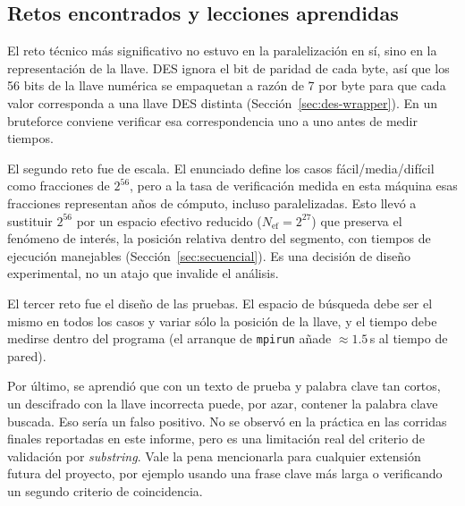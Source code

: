 \documentclass[11pt,letterpaper]{article}
\begin{document}
\subsection*{Retos encontrados y lecciones aprendidas}

El reto técnico más significativo no estuvo en la paralelización en
sí, sino en la representación de la llave. DES ignora el bit de paridad
de cada byte, así que los 56 bits de la llave numérica se empaquetan a
razón de 7 por byte para que cada valor corresponda a una llave DES
distinta (Sección~\ref{sec:des-wrapper}). En un bruteforce conviene
verificar esa correspondencia uno a uno antes de medir tiempos.

El segundo reto fue de escala. El enunciado define los casos
fácil/media/difícil como fracciones de $2^{56}$, pero a la tasa de
verificación medida en esta máquina esas fracciones representan años
de cómputo, incluso paralelizadas. Esto llevó a sustituir $2^{56}$ por
un espacio efectivo reducido ($N_{\text{ef}} = 2^{27}$) que preserva
el fenómeno de interés, la posición relativa dentro del segmento, con
tiempos de ejecución manejables (Sección~\ref{sec:secuencial}). Es una
decisión de diseño experimental, no un atajo que invalide el análisis.

El tercer reto fue el diseño de las pruebas. El espacio de búsqueda debe
ser el mismo en todos los casos y variar sólo la posición de la llave, y
el tiempo debe medirse dentro del programa (el arranque de
\texttt{mpirun} añade $\approx1.5$\,s al tiempo de pared).

Por último, se aprendió que con un texto de prueba y palabra clave tan
cortos, un descifrado con la llave incorrecta puede, por azar,
contener la palabra clave buscada. Eso sería un falso positivo. No se
observó en la práctica en las corridas finales reportadas en este
informe, pero es una limitación real del criterio de validación por
\textit{substring}. Vale la pena mencionarla para cualquier extensión
futura del proyecto, por ejemplo usando una frase clave más larga o
verificando un segundo criterio de coincidencia.
\end{document}
